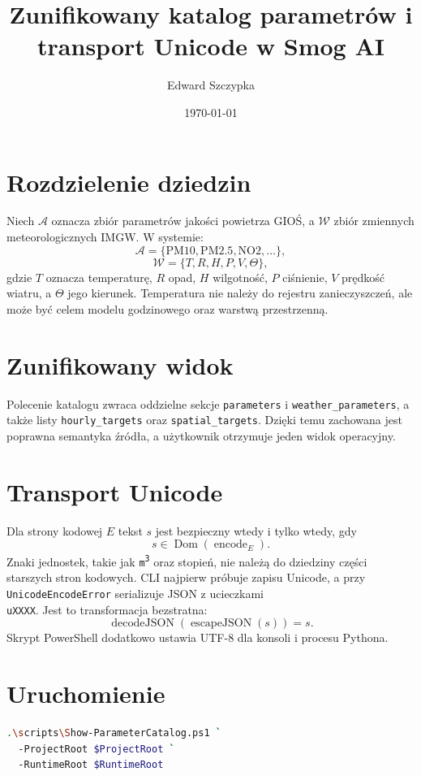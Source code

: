 \documentclass[11pt,a4paper]{article}
\title{Zunifikowany katalog parametrów i transport Unicode w Smog AI}
\author{Edward Szczypka}
\date{\today}
\begin{document}
\maketitle
\section{Rozdzielenie dziedzin}
Niech $\mathcal A$ oznacza zbiór parametrów jakości powietrza GIOŚ, a
$\mathcal W$ zbiór zmiennych meteorologicznych IMGW. W systemie:
\[
 \mathcal A=\{\mathrm{PM10},\mathrm{PM2.5},\mathrm{NO2},\ldots\},
\]
\[
 \mathcal W=\{T,R,H,P,V,\Theta\},
\]
gdzie $T$ oznacza temperaturę, $R$ opad, $H$ wilgotność, $P$ ciśnienie,
$V$ prędkość wiatru, a $\Theta$ jego kierunek. Temperatura nie należy do
rejestru zanieczyszczeń, ale może być celem modelu godzinowego oraz warstwą
przestrzenną.

\section{Zunifikowany widok}
Polecenie katalogu zwraca oddzielne sekcje \texttt{parameters} i
\texttt{weather\_parameters}, a także listy \texttt{hourly\_targets} oraz
\texttt{spatial\_targets}. Dzięki temu zachowana jest poprawna semantyka
źródła, a użytkownik otrzymuje jeden widok operacyjny.

\section{Transport Unicode}
Dla strony kodowej $E$ tekst $s$ jest bezpieczny wtedy i tylko wtedy, gdy
\[
 s\in\operatorname{Dom}(\operatorname{encode}_E).
\]
Znaki jednostek, takie jak \texttt{m\textsuperscript{3}} oraz stopień, nie
należą do dziedziny części starszych stron kodowych. CLI najpierw próbuje
zapisu Unicode, a przy \texttt{UnicodeEncodeError} serializuje JSON z
ucieczkami \texttt{\\uXXXX}. Jest to transformacja bezstratna:
\[
 \operatorname{decodeJSON}(\operatorname{escapeJSON}(s))=s.
\]
Skrypt PowerShell dodatkowo ustawia UTF-8 dla konsoli i procesu Pythona.

\section{Uruchomienie}
\begin{lstlisting}[language=bash]
.\scripts\Show-ParameterCatalog.ps1 `
  -ProjectRoot $ProjectRoot `
  -RuntimeRoot $RuntimeRoot
\end{lstlisting}
\end{document}
